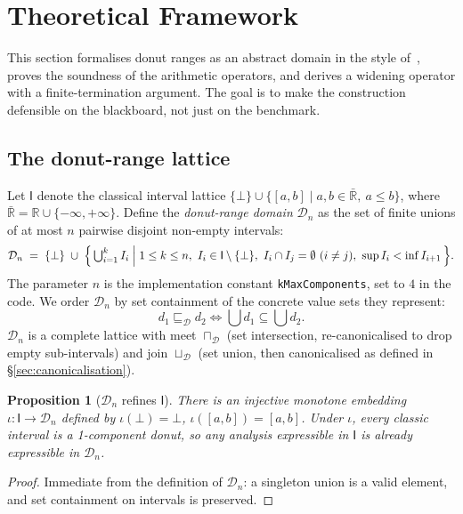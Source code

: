 \documentclass[11pt,a4paper]{article}
\theoremstyle{plain}
\newtheorem{proposition}{Proposition}
\begin{document}
\section{Theoretical Framework}
\label{sec:theory}

This section formalises donut ranges as an abstract domain in the
style of~\cite{history-ai}, proves the soundness of the arithmetic
operators, and derives a widening operator with a finite-termination
argument. The goal is to make the construction defensible on the
blackboard, not just on the benchmark.

\subsection{The donut-range lattice}
\label{sec:lattice}

Let $\mathsf{I}$ denote the classical interval lattice
$\{\bot\}\cup\{[a,b]\mid a,b\in\bar{\mathbb{R}},\ a\le b\}$, where
$\bar{\mathbb{R}} = \mathbb{R}\cup\{-\infty,+\infty\}$. Define the
\emph{donut-range domain} $\mathcal{D}_n$ as the set of finite unions
of at most $n$ pairwise disjoint non-empty intervals:
\[
\mathcal{D}_n \;=\; \{\bot\}\;\cup\;\Bigl\{\,\textstyle\bigcup_{i=1}^{k}I_i
  \;\Big|\; 1\le k\le n,\ I_i\in\mathsf{I}\setminus\{\bot\},\
  I_i\cap I_j = \emptyset\ (i\ne j),\ \sup I_i < \inf I_{i+1}\,\Bigr\}.
\]
The parameter $n$ is the implementation constant
\texttt{kMaxComponents}, set to $4$ in the code. We order
$\mathcal{D}_n$ by set containment of the concrete value sets they
represent:
\[
d_1 \sqsubseteq_{\mathcal{D}} d_2 \iff \textstyle\bigcup d_1 \subseteq \bigcup d_2.
\]
$\mathcal{D}_n$ is a complete lattice with meet $\sqcap_{\mathcal{D}}$
(set intersection, re-canonicalised to drop empty sub-intervals) and
join $\sqcup_{\mathcal{D}}$ (set union, then canonicalised as defined
in \S\ref{sec:canonicalisation}).

\begin{proposition}[$\mathcal{D}_n$ refines $\mathsf{I}$]\label{prop:refines}
There is an injective monotone embedding $\iota\colon\mathsf{I}\to\mathcal{D}_n$
defined by $\iota(\bot)=\bot$, $\iota([a,b]) = [a,b]$. Under $\iota$,
every classic interval is a 1-component donut, so any analysis
expressible in $\mathsf{I}$ is already expressible in $\mathcal{D}_n$.
\end{proposition}
\begin{proof}
Immediate from the definition of $\mathcal{D}_n$: a singleton union is
a valid element, and set containment on intervals is preserved.
\end{proof}
\end{document}
